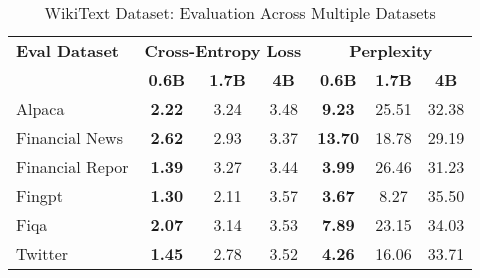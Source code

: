 
\begin{table}[h]
\centering
\caption[WikiText: Evaluation Results]{WikiText Dataset: Evaluation Across Multiple Datasets}
\label{tab:wikitext_results}
\begin{tabular}{l|ccc|ccc}
\hline
\textbf{Eval Dataset} & \multicolumn{3}{c|}{\textbf{Cross-Entropy Loss}} & \multicolumn{3}{c}{\textbf{Perplexity}} \\
\cline{2-4} \cline{5-7}
  & \textbf{0.6B} & \textbf{1.7B} & \textbf{4B} & \textbf{0.6B} & \textbf{1.7B} & \textbf{4B} \\
Alpaca & \textbf{2.22} & 3.24 & 3.48 & \textbf{9.23} & 25.51 & 32.38 \\
Financial News & \textbf{2.62} & 2.93 & 3.37 & \textbf{13.70} & 18.78 & 29.19 \\
Financial Repor & \textbf{1.39} & 3.27 & 3.44 & \textbf{3.99} & 26.46 & 31.23 \\
Fingpt & \textbf{1.30} & 2.11 & 3.57 & \textbf{3.67} & 8.27 & 35.50 \\
Fiqa & \textbf{2.07} & 3.14 & 3.53 & \textbf{7.89} & 23.15 & 34.03 \\
Twitter & \textbf{1.45} & 2.78 & 3.52 & \textbf{4.26} & 16.06 & 33.71 \\
\hline
\end{tabular}
\end{table}

